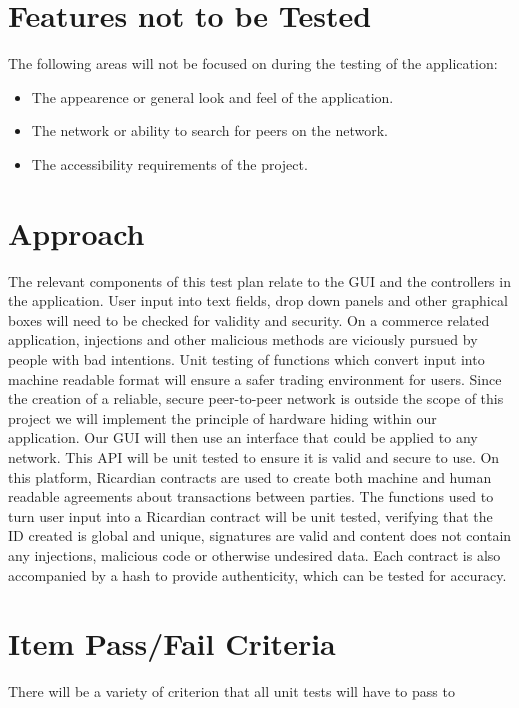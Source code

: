 \documentclass{article}
\begin{document}
\section*{Features not to be Tested}
The following areas will not be focused on during the testing of the application:
\newline
\begin{itemize}
 \item
The appearence or general look and feel of the application.
 \item
The network or ability to search for peers on the network.
\item
The accessibility requirements of the project.
\end{itemize}

\section*{Approach}
The relevant components of this test plan relate to the GUI and the controllers in the application. User input into text fields, drop down panels and other graphical boxes will need to be checked for validity and security. On a commerce related application, injections and other malicious methods are viciously pursued by people with bad intentions. Unit testing of functions which convert input into machine readable format will ensure a safer trading environment for users. Since the creation of a reliable, secure peer-to-peer network is outside the scope of this project we will implement the principle of hardware hiding within our application. Our GUI will then use an interface that could be applied to any network. This API will be unit tested to ensure it is valid and secure to use. On this platform, Ricardian contracts are used to create both machine and human readable agreements about transactions between parties. The functions used to turn user input into a Ricardian contract will be unit tested, verifying that the ID created is global and unique, signatures are valid and content does not contain any injections, malicious code or otherwise undesired data. Each contract is also accompanied by a hash to provide authenticity, which can be tested for accuracy.

\section*{Item Pass/Fail Criteria}
There will be a variety of criterion that all unit tests will have to pass to
\end{document}
